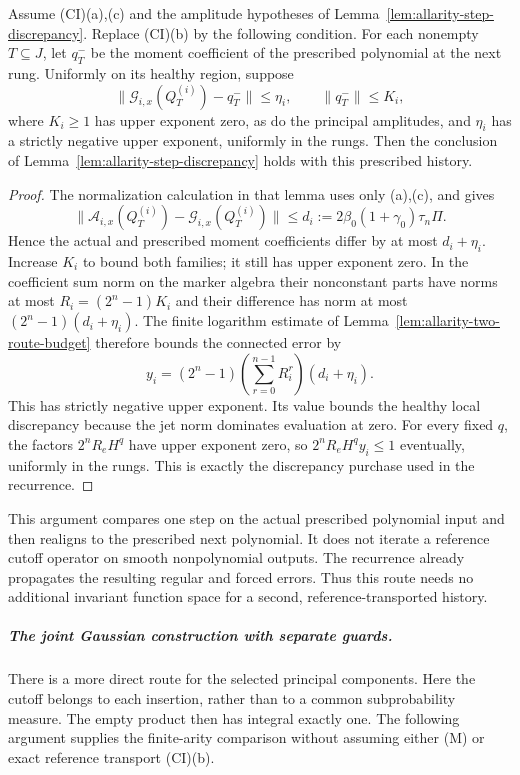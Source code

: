 \begin{lemma}
\label{lem:allarity-local-transport-defect}
Assume (CI)(a),(c) and the amplitude hypotheses of
Lemma~\ref{lem:allarity-step-discrepancy}. Replace (CI)(b) by the following
condition. For each nonempty $T\subseteq J$, let $q^-_T$ be the moment
coefficient of the prescribed polynomial at the next rung. Uniformly on
its healthy region, suppose
\[
 \|\mathcal G_{i,x}(Q^{(i)}_T)-q^-_T\|\le\eta_i,
 \qquad \|q^-_T\|\le K_i,
\]
where $K_i\ge1$ has upper exponent zero, as do the principal amplitudes,
and $\eta_i$ has a strictly negative upper exponent, uniformly in the
rungs. Then the conclusion of Lemma~\ref{lem:allarity-step-discrepancy}
holds with this prescribed history.
\end{lemma}
\begin{proof}
The normalization calculation in that lemma uses only (a),(c), and gives
\[
 \|\mathcal A_{i,x}(Q^{(i)}_T)-\mathcal G_{i,x}(Q^{(i)}_T)\|
 \le d_i:=2\beta_0(1+\gamma_0)\tau_n\Pi.
\]
Hence the actual and prescribed moment coefficients differ by at most
$d_i+\eta_i$. Increase $K_i$ to bound both families; it still has upper
exponent zero. In the coefficient sum norm on the marker algebra their
nonconstant parts have norms at most $R_i=(2^n-1)K_i$ and their
difference has norm at most $(2^n-1)(d_i+\eta_i)$.
The finite logarithm estimate of Lemma~\ref{lem:allarity-two-route-budget}
therefore bounds the connected error by
\[
 y_i=(2^n-1)\left(\sum_{r=0}^{n-1}R_i^r\right)(d_i+\eta_i).
\]
This has strictly negative upper exponent. Its value bounds the healthy
local discrepancy because the jet norm dominates evaluation at zero.
For every fixed $q$, the factors $2^nR_eH^q$ have upper exponent zero,
so $2^nR_eH^qy_i\le1$ eventually, uniformly in the rungs.
This is exactly the discrepancy purchase used in the recurrence.
\end{proof}

This argument compares one step on the actual prescribed polynomial
input and then realigns to the prescribed next polynomial. It does not
iterate a reference cutoff operator on smooth nonpolynomial outputs.
The recurrence already propagates the resulting regular and forced
errors. Thus this route needs no additional invariant function space
for a second, reference-transported history.

\subparagraph{The joint Gaussian construction with separate guards.}
There is a more direct route for the selected principal components.
Here the cutoff belongs to each insertion, rather than to a common
subprobability measure. The empty product then has integral exactly one.
The following argument supplies the finite-arity comparison without
assuming either (M) or exact reference transport (CI)(b).


